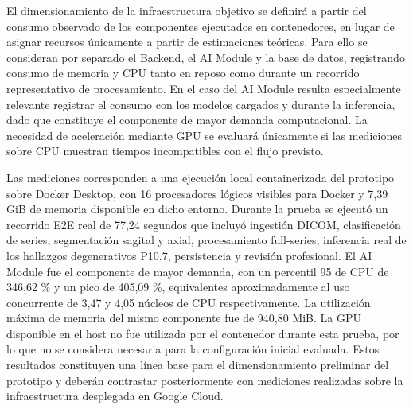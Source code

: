El dimensionamiento de la infraestructura objetivo se definirá a partir del consumo observado de los componentes ejecutados en contenedores, en lugar de asignar recursos únicamente a partir de estimaciones teóricas. Para ello se consideran por separado el Backend, el AI Module y la base de datos, registrando consumo de memoria y CPU tanto en reposo como durante un recorrido representativo de procesamiento. En el caso del AI Module resulta especialmente relevante registrar el consumo con los modelos cargados y durante la inferencia, dado que constituye el componente de mayor demanda computacional. La necesidad de aceleración mediante GPU se evaluará únicamente si las mediciones sobre CPU muestran tiempos incompatibles con el flujo previsto.


Las mediciones corresponden a una ejecución local containerizada del prototipo sobre Docker Desktop, con 16 procesadores lógicos visibles para Docker y 7,39 GiB de memoria disponible en dicho entorno. Durante la prueba se ejecutó un recorrido E2E real de 77,24 segundos que incluyó ingestión DICOM, clasificación de series, segmentación sagital y axial, procesamiento full-series, inferencia real de los hallazgos degenerativos P10.7, persistencia y revisión profesional. El AI Module fue el componente de mayor demanda, con un percentil 95 de CPU de 346,62 \% y un pico de 405,09 \%, equivalentes aproximadamente al uso concurrente de 3,47 y 4,05 núcleos de CPU respectivamente. La utilización máxima de memoria del mismo componente fue de 940,80 MiB. La GPU disponible en el host no fue utilizada por el contenedor durante esta prueba, por lo que no se considera necesaria para la configuración inicial evaluada. Estos resultados constituyen una línea base para el dimensionamiento preliminar del prototipo y deberán contrastar posteriormente con mediciones realizadas sobre la infraestructura desplegada en Google Cloud.


